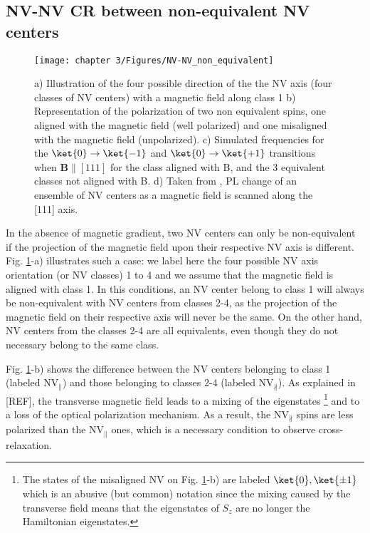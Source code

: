 \documentclass[a4paper, 11pt]{book}
\begin{document}
\subsection{NV-NV CR between non-equivalent NV centers}
\label{non_equi_valent_CR}
\begin{figure}[h]
\centering
\texttt{[image: chapter 3/Figures/NV-NV\_non\_equivalent]}
\caption{a) Illustration of the four possible direction of the the NV axis (four classes of NV centers) with a magnetic field along class 1 b) Representation of the polarization of two non equivalent spins, one aligned with the magnetic field (well polarized) and one misaligned with the magnetic field (unpolarized). c) Simulated frequencies for the $\ket{0} \to \ket{-1}$ and $\ket{0} \to \ket{+1}$ transitions when $\mathbf{B}\parallel [111]$ for the class aligned with B, and the 3 equivalent classes not aligned with B. d) Taken from \citep{armstrong2010nv}, PL change of an ensemble of NV centers as a magnetic field is scanned along the [111] axis.}
\label{non-equivalent NV-NV}
\end{figure}

In the absence of magnetic gradient, two NV centers can only be non-equivalent if the projection of the magnetic field upon their respective NV axis is different. Fig. \ref{non-equivalent NV-NV}-a) illustrates such a case: we label here the four possible NV axis orientation (or NV classes) 1 to 4 and we assume that the magnetic field is aligned with class 1. In this conditions, an NV center belong to class 1 will always be non-equivalent with NV centers from classes 2-4, as the projection of the magnetic field on their respective axis will never be the same. On the other hand, NV centers from the classes 2-4 are all equivalents, even though they do not necessary belong to the same class.

Fig. \ref{non-equivalent NV-NV}-b) shows the difference between the NV centers belonging to class 1 (labeled NV$_\parallel$) and those belonging to classes 2-4 (labeled NV$_\nparallel$). As explained in [REF], the transverse magnetic field leads to a mixing of the eigenstates \footnote{The states of the misaligned NV on Fig. \ref{non-equivalent NV-NV}-b) are labeled $\ket{0},\ket{\pm 1}$ which is an abusive (but common) notation since the mixing caused by the transverse field means that the eigenstates of $S_z$ are no longer the Hamiltonian eigenstates.} and to a loss of the optical polarization mechanism. As a result, the NV$_\nparallel$ spins are less polarized than the NV$_\parallel$ ones, which is a necessary condition to observe cross-relaxation.
\end{document}
